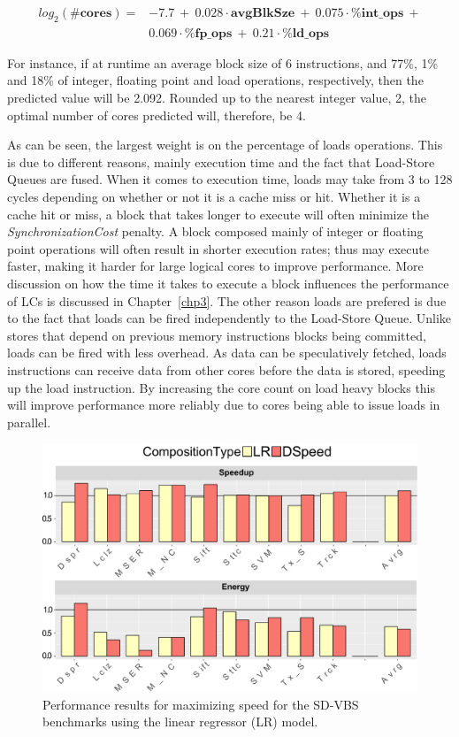 \begin{align*}
  log_2(\textbf{\#cores}) = & -7.7\ +\ 0.028 \cdot \textbf{avgBlkSze}\ +\ 0.075 \cdot \textbf{\%int\_ops}\ +\\
 &0.069 \cdot \textbf{\%fp\_ops}\ +\ 0.21 \cdot \textbf{\%ld\_ops}
\end{align*}

For instance, if at runtime an average block size of 6 instructions, and 77\%, 1\% and 18\% of integer, floating point and load operations, respectively, then the predicted value will be 2.092.
Rounded up to the nearest integer value, 2, the optimal number of cores predicted will, therefore, be 4.

As can be seen, the largest weight is on the percentage of loads operations.
This is due to different reasons, mainly execution time and the fact that Load-Store Queues are fused.
When it comes to execution time, loads may take from 3 to 128 cycles depending on whether or not it is a cache miss or hit.
Whether it is a cache hit or miss, a block that takes longer to execute will often minimize the \textit{SynchronizationCost} penalty.
A block composed mainly of integer or floating point operations will often result in shorter execution rates; thus may execute faster, making it harder for large logical cores to improve performance.
More discussion on how the time it takes to execute a block influences the performance of LCs is discussed in Chapter~\ref{chp3}.
The other reason loads are prefered is due to the fact that loads can be fired independently to the Load-Store Queue.
Unlike stores that depend on previous memory instructions blocks being committed, loads can be fired with less overhead.
As data can be speculatively fetched, loads instructions can receive data from other cores before the data is stored, speeding up the load instruction.
By increasing the core count on load heavy blocks this will improve performance more reliably due to cores being able to issue loads in parallel.

\begin{figure}[t]
    \centering
	\includegraphics[width=1\textwidth]{cases-paper/graphics/results/lr_speed2.pdf}
    \caption{Performance results for maximizing speed for the SD-VBS benchmarks using the linear regressor (LR) model.}%
    \label{fig:speedlr}
\end{figure}

